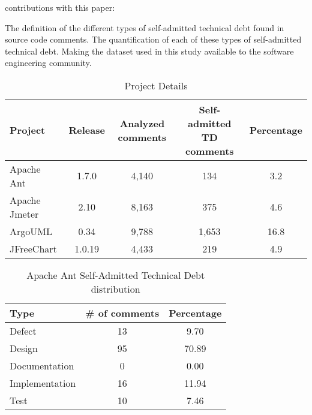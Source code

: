contributions with this paper:

The definition of the different types of self-admitted technical debt found in source code comments.
The quantification of each of these types of self-admitted technical debt.
Making the dataset used in this study available to the software engineering community.  

\begin{table*}[!hbt]
      \begin{center}
            \caption{Project Details}
            \label{tab:project_details}
            \begin{tabular}{l| c c c c }
            \toprule
            \textbf{Project}   & \textbf{Release}          & \textbf{Analyzed comments}     & \textbf{Self-admitted TD comments} & \textbf{Percentage} \\ \midrule 
              Apache Ant       & 1.7.0                     & 4,140                          & 134                                & 3.2  \\                                   
              Apache Jmeter    & 2.10                      & 8,163                          & 375                                & 4.6  \\                                   
              ArgoUML          & 0.34                      & 9,788                          & 1,653                              & 16.8 \\                                   
              JFreeChart       & 1.0.19                    & 4,433                          & 219                                & 4.9  \\ \bottomrule
            \end{tabular}
      \end{center}
\end{table*}


\begin{table*}[!hbt]
      \begin{center}
            \caption{Apache Ant Self-Admitted Technical Debt distribution}
            \label{tab:ant_td_details}
            \begin{tabular}{l| c c }
            \toprule
            \textbf{Type}   & \textbf{\# of comments}     & \textbf{Percentage}  \\ \midrule 
             Defect          & 13             & 9.70\\     
             Design          & 95             & 70.89\\    
             Documentation   & 0              & 0.00\\      
             Implementation  & 16             & 11.94\\    
             Test            & 10             & 7.46\\  \bottomrule                                   
            \end{tabular}
      \end{center}
\end{table*}

